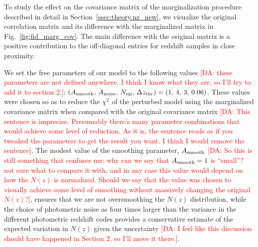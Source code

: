 \documentclass[a4paper,11pt]{article}
\newcommand{\da}[1]{{\textcolor{red}{[DA: #1]}}}
\begin{document}
      To study the effect on the covariance matrix of the marginalization procedure described in detail in Section~\ref{ssec:theory.nz_new}, we visualize the original correlation matrix and its difference with the marginalized matrix in Fig.~\ref{fig:fid_marg_cov}. The main difference with the original matrix is a positive contribution to the off-diagonal entries for redshift samples in close proximity.
      
      We set the free parameters of our model to the following values \da{these parameters are not defined anywhere. I think I know what they are, so I'll try to add it to section 2.}: $(A_{\rm smooth},\,A_{\rm noise},\,N_{\rm up},\,\Delta z_{\rm thr})=(1,\,4,\,3,\,0.06)$. These values were chosen so as to reduce the $\chi^2$ of the perturbed model using the marginalized covariance matrix when compared with the original covariance matrix \da{This sentence is imprecise. Presumably there's many parameter combinations that would achieve some level of reduction. As it is, the sentence reads as if you tweaked the parameters to get the result you want. I think I would remove the sentence}. The modest value of the smoothing parameter, $A_{\rm smooth}$ \da{So this is still something that confuses me: why can we say that $A_{\rm smooth}=1$ is ``small''? not sure what to compare it with, and in any case this value would depend on how the $N(z)$ is normalized. Should we say that the value was chosen to visually achieve some level of smoothing without massively changing the original $N(z)$?}, ensures that we are not oversmoothing the $N(z)$ distribution, while the choice of photometric noise as four times larger than the variance in the different photometric redshift codes provides a conservative estimate of the expected variation in $N(z)$ given the uncertainty \da{I feel like this discussion should have happened in Section 2, so I'll move it there.}.
\end{document}
